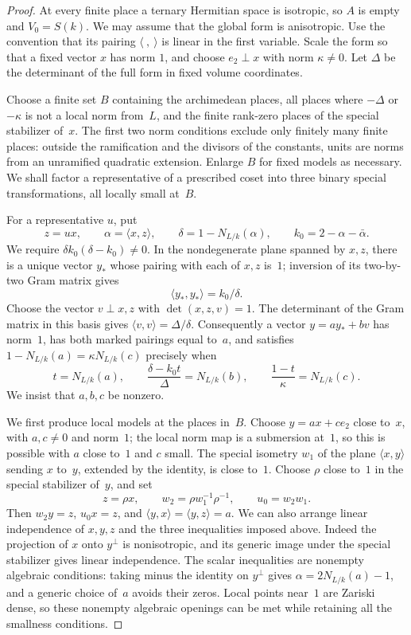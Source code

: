 \begin{proof}
At every finite place a ternary Hermitian space is isotropic, so $A$ is
empty and $V_0=S(k)$.  We may assume that the global form is anisotropic.
Use the convention that its pairing $\langle\ ,\ \rangle$ is linear in
the first variable.  Scale the form so that a fixed vector $x$ has norm
$1$, and choose $e_2\perp x$ with norm $\kappa\ne0$.  Let $\Delta$ be
the determinant of the full form in fixed volume coordinates.

Choose a finite set $B$ containing the archimedean places, all places
where $-\Delta$ or $-\kappa$ is not a local norm from~$L$, and the finite
rank-zero places of the special stabilizer of~$x$.  The first two norm
conditions exclude only finitely many finite places: outside the
ramification and the divisors of the constants, units are norms from
an unramified quadratic extension.  Enlarge $B$ for fixed models as
necessary.  We shall factor a representative of a prescribed coset
into three binary special transformations, all locally small at~$B$.

For a representative $u$, put
\[
 z=ux,\qquad \alpha=\langle x,z\rangle,\qquad
 \delta=1-N_{L/k}(\alpha),\qquad
 k_0=2-\alpha-\bar\alpha.
\]
We require $\delta k_0(\delta-k_0)\ne0$.  In the nondegenerate plane
spanned by $x,z$, there is a unique vector $y_*$ whose pairing with each
of $x,z$ is~$1$; inversion of its two-by-two Gram matrix gives
\[
 \langle y_*,y_*\rangle=k_0/\delta.
\]
Choose the vector $v\perp x,z$ with $\det(x,z,v)=1$.  The determinant
of the Gram matrix in this basis gives
$\langle v,v\rangle=\Delta/\delta$.  Consequently a vector
$y=a y_*+b v$ has norm~$1$, has both marked pairings equal to~$a$, and
satisfies $1-N_{L/k}(a)=\kappa N_{L/k}(c)$ precisely when
\begin{equation}\label{eq:unitary-three-norms}
 t=N_{L/k}(a),\qquad
 \frac{\delta-k_0t}{\Delta}=N_{L/k}(b),\qquad
 \frac{1-t}{\kappa}=N_{L/k}(c).
\end{equation}
We insist that $a,b,c$ be nonzero.

We first produce local models at the places in~$B$.  Choose
$y=a x+c e_2$ close to~$x$, with $a,c\ne0$ and norm~$1$; the local norm
map is a submersion at~$1$, so this is possible with $a$ close to~$1$
and $c$ small.  The special isometry $w_1$ of the plane $\langle x,y\rangle$
sending $x$ to~$y$, extended by the identity, is close to~$1$.
Choose $\rho$ close to~$1$ in the special stabilizer of~$y$, and set
\[
 z=\rho x,\qquad
 w_2=\rho w_1^{-1}\rho^{-1},\qquad u_0=w_2w_1.
\]
Then $w_2y=z$, $u_0x=z$, and
$\langle y,x\rangle=\langle y,z\rangle=a$.
We can also arrange linear independence of $x,y,z$ and the three
inequalities imposed above.  Indeed the projection of $x$ onto
$y^\perp$ is nonisotropic, and its generic image under the special
stabilizer gives linear independence.  The scalar inequalities are
nonempty algebraic conditions: taking minus the identity on
$y^\perp$ gives $\alpha=2N_{L/k}(a)-1$, and a generic choice of~$a$
avoids their zeros.  Local points near~$1$ are Zariski dense, so these
nonempty algebraic openings can be met while retaining all the
smallness conditions.


\end{proof}
